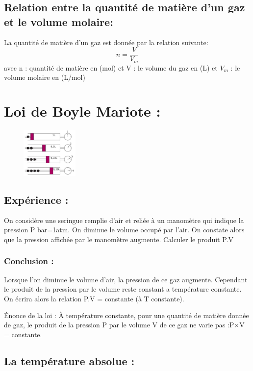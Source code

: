 \documentclass[12pt]{article}
\begin{document}
\subsection{Relation entre la quantité de matière d'un gaz et le volume molaire: }
La quantité de matière d'un gaz est donnée par la relation suivante:
$$n = \frac{V}{V_m}$$
avec n : quantité de matière en (mol) et V : le volume du gaz en (L) et $V_m$ : le volume molaire en (L/mol)



\section{Loi de Boyle Mariote : }
\begin{figure}
    \centering
\includegraphics[width=0.25\textwidth]{./img/img01.png}
\end{figure} 

\subsection{Expérience : }
On considère une seringue remplie d’air et reliée à un manomètre
qui indique la pression P bar=1atm. On diminue le volume occupé par
l’air. On constate alors que la pression affichée par le manomètre
augmente.
Calculer le produit P.V

\subsubsection{Conclusion : }
Lorsque l’on diminue le volume d’air, la pression de ce gaz augmente.
Cependant le produit de la pression par le volume reste constant a
température constante.
On écrira alors la relation P.V = constante (à T constante).

Énonce de la loi :
À température constante, pour une quantité de matière donnée de gaz, le produit de la
pression P par le volume V de ce gaz ne varie pas :P×V = constante.

\subsection{La température absolue : }
\end{document}
